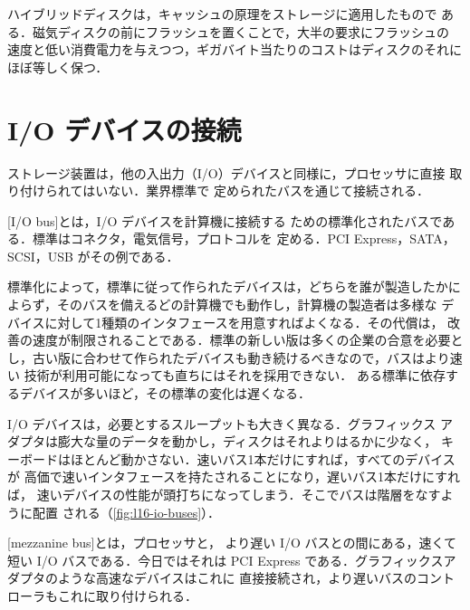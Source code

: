 \documentclass[../main.tex]{subfiles}
\begin{document}
\begin{keypoint}
  ハイブリッドディスクは，キャッシュの原理をストレージに適用したもので
  ある．磁気ディスクの前にフラッシュを置くことで，大半の要求にフラッシュの
  速度と低い消費電力を与えつつ，ギガバイト当たりのコストはディスクのそれに
  ほぼ等しく保つ．
\end{keypoint}

\section{I/O デバイスの接続}
\label{sec:l16-io}

ストレージ装置は，他の入出力（I/O）デバイスと同様に，プロセッサに直接
取り付けられてはいない．業界標準で
定められたバスを通じて接続される．

\begin{definition}[I/O バス]
  [I/O bus]とは，I/O デバイスを計算機に接続する
  ための標準化されたバスである．標準はコネクタ，電気信号，プロトコルを
  定める．PCI Express，SATA，SCSI，USB がその例である．
\end{definition}

標準化によって，標準に従って作られたデバイスは，どちらを誰が製造したかに
よらず，そのバスを備えるどの計算機でも動作し，計算機の製造者は多様な
デバイスに対して1種類のインタフェースを用意すればよくなる．その代償は，
改善の速度が制限されることである．標準の新しい版は多くの企業の合意を必要と
し，古い版に合わせて作られたデバイスも動き続けるべきなので，バスはより速い
技術が利用可能になっても直ちにはそれを採用できない．
ある標準に依存するデバイスが多いほど，その標準の変化は遅くなる．

I/O デバイスは，必要とするスループットも大きく異なる．グラフィックス
アダプタは膨大な量のデータを動かし，ディスクはそれよりはるかに少なく，
キーボードはほとんど動かさない．速いバス1本だけにすれば，すべてのデバイスが
高価で速いインタフェースを持たされることになり，遅いバス1本だけにすれば，
速いデバイスの性能が頭打ちになってしまう．そこでバスは階層をなすように配置
される（\cref{fig:l16-io-buses}）．

\begin{definition}[メザニンバス]
  [mezzanine bus]とは，プロセッサと，
  より遅い I/O バスとの間にある，速くて短い I/O バスである．今日ではそれは
  PCI Express である．グラフィックスアダプタのような高速なデバイスはこれに
  直接接続され，より遅いバスのコントローラもこれに取り付けられる．
\end{definition}
\end{document}
